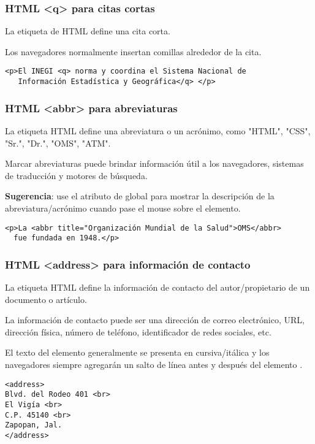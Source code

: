 \begin{frame}[fragile]
  \frametitle{HTML <q> para citas cortas}

  La etiqueta  de HTML define una cita corta.

  \vspace{\baselineskip}
  Los navegadores normalmente insertan comillas alrededor de la cita.

  \vspace{\baselineskip}
  \begin{lstlisting}
<p>El INEGI <q> norma y coordina el Sistema Nacional de
   Información Estadística y Geográfica</q> </p>
  \end{lstlisting}
\end{frame}

\begin{frame}[fragile]
  \frametitle{HTML <abbr> para abreviaturas}

  La etiqueta HTML  define una abreviatura o un
  acrónimo, como "HTML", "CSS", "Sr.", "Dr.", "OMS", "ATM".

  \vspace{\baselineskip}
  Marcar abreviaturas puede brindar información útil a los navegadores,
  sistemas de traducción y motores de búsqueda.

  \vspace{\baselineskip}
  \textbf{Sugerencia}: use el atributo de  global para mostrar
  la descripción de la abreviatura/acrónimo cuando pase el mouse sobre
  el elemento.

  \vspace{\baselineskip}
  \begin{lstlisting}
<p>La <abbr title="Organización Mundial de la Salud">OMS</abbr>
  fue fundada en 1948.</p>
  \end{lstlisting}
\end{frame}

\begin{frame}[fragile]
  \frametitle{HTML <address> para información de contacto}

  La etiqueta HTML  define la información de
  contacto del autor/propietario de un documento o artículo.

  \vspace{\baselineskip}
  La información de contacto puede ser una dirección de correo
  electrónico, URL, dirección física, número de teléfono,
  identificador de redes sociales, etc.

  \vspace{\baselineskip}
  El texto del elemento  generalmente se presenta
  en cursiva/itálica y los navegadores siempre agregarán un salto
  de línea antes y después del elemento .

  \vspace{\baselineskip}
  \begin{lstlisting}
<address>
Blvd. del Rodeo 401 <br>
El Vigía <br>
C.P. 45140 <br>
Zapopan, Jal.
</address>
  \end{lstlisting}
\end{frame}

